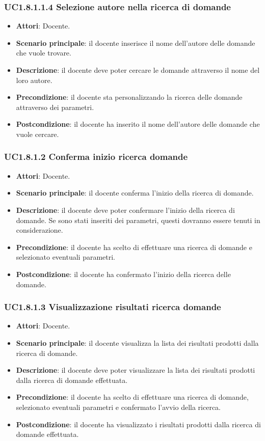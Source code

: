 \subsubsection{UC1.8.1.1.4 Selezione autore nella ricerca di domande}
\begin{itemize}
\item \textbf{Attori}: Docente.
\item \textbf{Scenario principale}: il docente inserisce il nome dell'autore delle domande che vuole trovare.
\item \textbf{Descrizione}: il docente deve poter cercare le domande attraverso il nome del loro autore.
\item \textbf{Precondizione}: il docente sta personalizzando la ricerca delle domande attraverso dei parametri.
\item \textbf{Postcondizione}: il docente ha inserito il nome dell'autore delle domande che vuole cercare.
\end{itemize}
\subsubsection{UC1.8.1.2 Conferma inizio ricerca domande}
\begin{itemize}
\item \textbf{Attori}: Docente.
\item \textbf{Scenario principale}: il docente conferma l'inizio della ricerca di domande.
\item \textbf{Descrizione}: il docente deve poter confermare l'inizio della ricerca di domande. Se sono stati inseriti dei parametri, questi dovranno essere tenuti in considerazione.
\item \textbf{Precondizione}: il docente ha scelto di effettuare una ricerca di domande e selezionato eventuali parametri.
\item \textbf{Postcondizione}: il docente ha confermato l'inizio della ricerca delle domande.
\end{itemize}
\subsubsection{UC1.8.1.3 Visualizzazione risultati ricerca domande}
\begin{itemize}
\item \textbf{Attori}: Docente.
\item \textbf{Scenario principale}: il docente visualizza la lista dei risultati prodotti dalla ricerca di domande.
\item \textbf{Descrizione}: il docente deve poter visualizzare la lista dei risultati prodotti dalla ricerca di domande effettuata.
\item \textbf{Precondizione}: il docente ha scelto di effettuare una ricerca di domande, selezionato eventuali parametri e confermato l'avvio della ricerca.
\item \textbf{Postcondizione}: il docente ha visualizzato i risultati prodotti dalla ricerca di domande effettuata.
\end{itemize}
